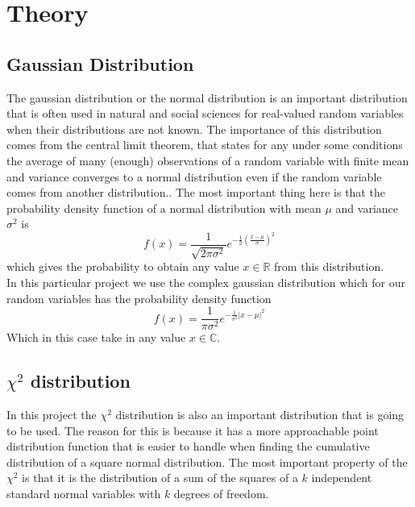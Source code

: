 \section{Theory}\label{sec:theory}
\subsection{Gaussian Distribution}
The gaussian distribution or the normal distribution is an important distribution that is often used in natural and social sciences for real-valued random variables when their distributions are not known. The importance of this distribution comes from the central limit theorem, that states for any under some conditions the average of many (enough) observations of a random variable with finite mean and variance converges to a normal distribution even if the random variable comes from another distribution.\cite{WikipediaGaussian}. The most important thing here is that the probability density function of a normal distribution with mean $\mu$ and variance $\sigma^2$ is
\begin{equation}
	f(x) = \frac{1}{\sqrt{2\pi\sigma^2}}e^{-\frac{1}{2}(\frac{x-\mu}{\sigma})^2}
\end{equation}
which gives the probability to obtain any value $x\in\mathbb{R}$ from this distribution.\\
In this particular project we use the complex gaussian distribution which for our random variables has the probability density function
\begin{equation}
	f(x) = \frac{1}{\pi\sigma^2}e^{-\frac{1}{\sigma^2}|x-\mu|^2}
\end{equation}
Which in this case take in any value $x\in\mathbb{C}$.
\subsection{$\chi^2$ distribution}
In this project the $\chi^2$ distribution is also an important distribution that is going to be used. The reason for this is because it has a more approachable point distribution function that is easier to handle when finding the cumulative distribution of a square normal distribution. The most important property of the $\chi^2$ is that it is the distribution of a sum of the squares of a $k$ independent standard normal variables with $k$ degrees of freedom.\cite{WikipediaChi}
